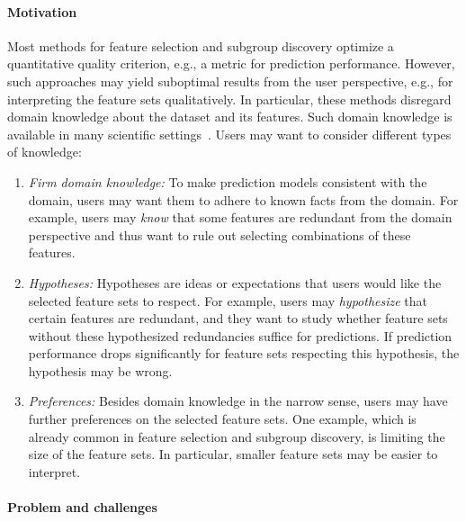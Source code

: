 \paragraph{Motivation}

Most methods for feature selection and subgroup discovery optimize a quantitative quality criterion, e.g., a metric for prediction performance.
However, such approaches may yield suboptimal results from the user perspective, e.g., for interpreting the feature sets qualitatively.
In particular, these methods disregard domain knowledge about the dataset and its features.
Such domain knowledge is available in many scientific settings~\cite{karpatne2017theory, wagner2016theory}.
Users may want to consider different types of knowledge:
%
\begin{enumerate}
	\item
	\emph{Firm domain knowledge:}
	To make prediction models consistent with the domain, users may want them to adhere to known facts from the domain.
	For example, users may \emph{know} that some features are redundant from the domain perspective and thus want to rule out selecting combinations of these features.
	\item
	\emph{Hypotheses:}
	Hypotheses are ideas or expectations that users would like the selected feature sets to respect.
	For example, users may \emph{hypothesize} that certain features are redundant, and they want to study whether feature sets without these hypothesized redundancies suffice for predictions.
	If prediction performance drops significantly for feature sets respecting this hypothesis, the hypothesis may be wrong.
	\item
	\emph{Preferences:}
	Besides domain knowledge in the narrow sense, users may have further preferences on the selected feature sets.
	One example, which is already common in feature selection and subgroup discovery, is limiting the size of the feature sets.
	In particular, smaller feature sets may be easier to interpret.
\end{enumerate}

\paragraph{Problem and challenges}

